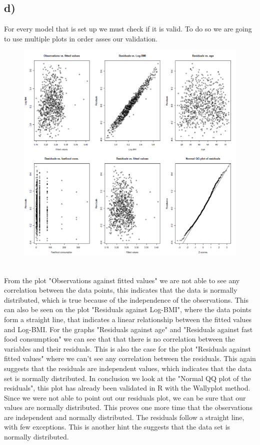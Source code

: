 \subsection{d)}
For every model that is set up we must check if it is valid. To do so we are going to use multiple plots in order asses our validation. \\
\begin{figure}[!h]
  \centering
  \includegraphics[width=0.75\linewidth]{root/Model_val.png}
  \label{ModelVal}
\end{figure} \\
From the plot "Observations against fitted values" we are not able to see any correlation between the data points, this indicates that the data is normally distributed, which is true because of the independence of the observations. This can also be seen on the plot "Residuals against Log-BMI", where the data points form a straight line, that indicates a linear relationship between the fitted values and Log-BMI. For the graphs "Residuals against age" and "Residuals against fast food consumption" we can see that that there is no correlation between the variables and their residuals. This is also the case for the plot "Residuals against fitted values" where we can't see any correlation between the residuals. This again suggests that the residuals are independent values, which indicates that the data set is normally distributed. In conclusion we look at the "Normal QQ plot of the residuals", this plot has already been validated in R with the Wallyplot method. Since we were not able to point out our residuals plot, we can be sure that our values are normally distributed. This proves one more time that the observations are independent and normally distributed. The residuals follow a straight line, with few exceptions. This is another hint the suggests that the data set is normally distributed. \\
